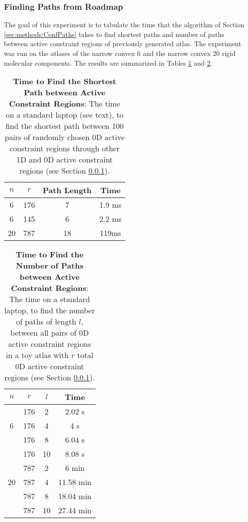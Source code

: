 \documentclass[]{article}
\newcommand{\rmc}{rigid molecular component}
\begin{document}
\subsubsection{Finding Paths from Roadmap}
\label{sec:results:ConfPaths}
The goal of this experiment is to tabulate the time that the algorithm of
Section \ref{sec:methods:ConfPaths} takes to find shortest paths and number of
paths between active constraint regions of previously generated atlas.  The
experiment was run on the atlases of the narrow convex 6 and the narrow convex
20 \rmc s. The results are summarized in Tables \ref{table:paths} and 
\ref{table:numPaths}.

\begin{table}
\centering
\begin{tabular}{|cccc|}\hline
$n$ & $r$ & Path Length& Time \\\hline
6& 176 & 7 & 1.9 ms \\\hline
6& 145 & 6 & 2.2 ms \\\hline
20& 787 & 18 & 119ms\\\hline
\end{tabular}
\caption{\scriptsize \textbf{Time to Find the Shortest Path between Active 
Constraint Regions}: 
The time on a standard laptop (see text), to find the 
shortest path between 100 pairs of randomly chosen 0D active constraint regions 
through other 1D and 0D active constraint regions (see Section \ref{sec:results:ConfPaths}).}
\label{table:paths}
\end{table}

\begin{table}
\centering
\begin{tabular}{|cccc|}\hline
$n$ & $r$ & $l$ & Time \\\hline
\multirow{3}{*}{6}
				&176 & 2 & 2.02 s\\
				&176 & 4 & 4 s\\
				&176 & 8 & 6.04 s\\
				&176 & 10 & 8.08 s\\\hline
\multirow{3}{*}{20}
				& 787 & 2 & 6 min\\
				& 787 & 4 & 11.58 min\\
				& 787 & 8 & 18.04 min\\
				& 787 & 10 & 27.44 min\\\hline
\end{tabular}
\caption{\scriptsize \textbf{Time to Find the Number of Paths between Active 
Constraint Regions}: The 
time on a standard laptop, to find the number of paths of 
length $l$, between all pairs of 0D active constraint regions 
in a toy atlas with $r$ total 0D active constraint regions (see Section \ref{sec:results:ConfPaths}).}
\label{table:numPaths}
\end{table}
\end{document}
